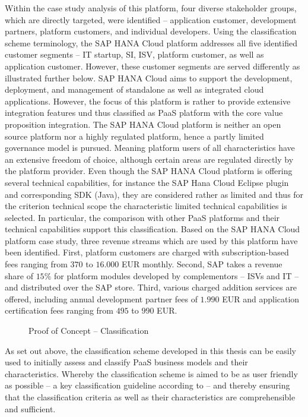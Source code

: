 Within the case study analysis of this platform, four diverse stakeholder groups, which are directly targeted, were identified -- application customer, development partners, platform customers, and individual developers. Using the classification scheme terminology, the SAP HANA Cloud platform addresses all five identified customer segments -- \ac{IT} startup, \ac{SI}, \ac{ISV}, platform customer, as well as application customer. However, these customer segments are served differently as illustrated further below. SAP HANA Cloud aims to support the development, deployment, and management of standalone as well as integrated cloud applications. However, the focus of this platform is rather to provide extensive integration features und thus classified as \ac{PaaS} platform with the core value proposition integration. The SAP HANA Cloud platform is neither an open source platform nor a highly regulated platform, hence a partly limited governance model is pursued. Meaning platform users of all characteristics have an extensive freedom of choice, although certain areas are regulated directly by the platform provider. Even though the SAP HANA Cloud platform is offering several technical capabilities, for instance the SAP Hana Cloud Eclipse plugin and corresponding \ac{SDK} (Java), they are considered rather as limited and thus for the criterion technical scope the characteristic limited technical capabilities is selected. In particular, the comparison with other \ac{PaaS} platforms and their technical capabilities support this classification. Based on the SAP HANA Cloud platform case study, three revenue streams which are used by this platform have been identified. First, platform customers are charged with subscription-based fees ranging from $370$ to $16.000$ \ac{EUR} monthly. Second, SAP takes a revenue share of $15\%$ for platform modules developed by complementors -- \acp{ISV} and \ac{IT} -- and distributed over the SAP store. Third, various charged addition services are offered, including annual development partner fees of $1.990$ \ac{EUR} and application certification fees ranging from $495$ to $990$ \ac{EUR}.

\begin{figure}[tb]
	\centering
	
	\caption{Proof of Concept -- Classification}
	\label{fig:cs:sap}
\end{figure}

As set out above, the classification scheme developed in this thesis can be easily used to initially assess and classify \ac{PaaS} business models and their characteristics. Whereby the classification scheme is aimed to be as user friendly as possible -- a key classification guideline according to \citet[p. 41]{Fettke2003} -- and thereby ensuring that the classification criteria as well as their characteristics are comprehensible and sufficient.



